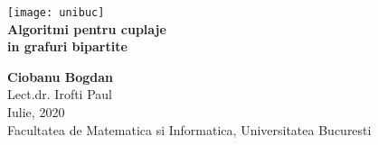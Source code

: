 \begin{titlepage}
  \vspace{1 in}
  \begin{center}
    \hspace{4in} \texttt{[image: unibuc]}
    \\
    \huge
    \textbf{Algoritmi pentru cuplaje \\ in grafuri bipartite} \\
    \vspace{0.8 in}

    \Large
    \textbf{Ciobanu Bogdan} \\
    Lect.dr. Irofti Paul \\

    \vspace*{\fill}
    Iulie, 2020 \\
    Facultatea de Matematica si Informatica, Universitatea Bucuresti \\

  \end{center}
\end{titlepage}

